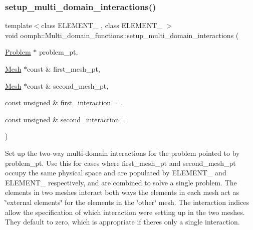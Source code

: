 \mbox{\label{namespaceoomph_1_1Multi__domain__functions_a4a7ac2c45985582b30ed3ecb5d2623d2}} 
\subsubsection{\texorpdfstring{setup\+\_\+multi\+\_\+domain\+\_\+interactions()}{setup\_multi\_domain\_interactions()}}
{\footnotesize\ttfamily template$<$class E\+L\+E\+M\+E\+N\+T\+\_ , class E\+L\+E\+M\+E\+N\+T\+\_ $>$ \\
void oomph\+::\+Multi\+\_\+domain\+\_\+functions\+::setup\+\_\+multi\+\_\+domain\+\_\+interactions (\begin{DoxyParamCaption}\item[{\hyperlink{classoomph_1_1Problem}{Problem} $\ast$}]{problem\+\_\+pt,  }\item[{\hyperlink{classoomph_1_1Mesh}{Mesh} $\ast$const \&}]{first\+\_\+mesh\+\_\+pt,  }\item[{\hyperlink{classoomph_1_1Mesh}{Mesh} $\ast$const \&}]{second\+\_\+mesh\+\_\+pt,  }\item[{const unsigned \&}]{first\+\_\+interaction = {},  }\item[{const unsigned \&}]{second\+\_\+interaction = {} }\end{DoxyParamCaption})}



Set up the two-\/way multi-\/domain interactions for the problem pointed to by {\ttfamily problem\+\_\+pt}. Use this for cases where first\+\_\+mesh\+\_\+pt and second\+\_\+mesh\+\_\+pt occupy the same physical space and are populated by E\+L\+E\+M\+E\+N\+T\+\_ and E\+L\+E\+M\+E\+N\+T\+\_ respectively, and are combined to solve a single problem. The elements in two meshes interact both ways the elements in each mesh act as \char`\"{}external elements\char`\"{} for the elements in the \char`\"{}other\char`\"{} mesh. The interaction indices allow the specification of which interaction we\textquotesingle{}re setting up in the two meshes. They default to zero, which is appropriate if there\textquotesingle{}s only a single interaction. 

